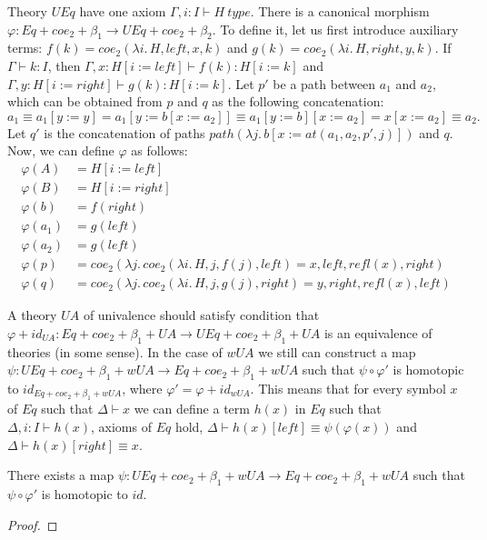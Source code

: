 \documentclass[reqno]{amsart}
\theoremstyle{definition}
\theoremstyle{remark}
\newcommand{\deq}{\equiv}
\newcommand{\repl}{:=}
\numberwithin{figure}{section}
\begin{document}
Theory $UEq$ have one axiom $\Gamma, i : I \vdash H\ type$.
There is a canonical morphism $\varphi : Eq + coe_2 + \beta_1 \to UEq + coe_2 + \beta_2$.
To define it, let us first introduce auxiliary terms: $f(k) = coe_2(\lambda i.\,H, left, x, k)$ and $g(k) = coe_2(\lambda i.\,H, right, y, k)$.
If $\Gamma \vdash k : I$, then $\Gamma, x : H[i \repl left] \vdash f(k) : H[i \repl k]$ and $\Gamma, y : H[i \repl right] \vdash g(k) : H[i \repl k]$.
Let $p'$ be a path between $a_1$ and $a_2$, which can be obtained from $p$ and $q$ as the following concatenation:
\[ a_1 \equiv a_1[y \repl y] = a_1[y \repl b[x \repl a_2]] \equiv a_1[y \repl b][x \repl a_2] = x[x \repl a_2] \equiv a_2. \]
Let $q'$ is the concatenation of paths $path(\lambda j.\,b[x \repl at(a_1, a_2, p',j)])$ and $q$.
Now, we can define $\varphi$ as follows:
\begin{align*}
\varphi(A) & = H[i \repl left] \\
\varphi(B) & = H[i \repl right] \\
\varphi(b) & = f(right) \\
\varphi(a_1) & = g(left) \\
\varphi(a_2) & = g(left) \\
\varphi(p) & = coe_2(\lambda j.\,coe_2(\lambda i.\,H, j, f(j), left) = x, left, refl(x), right) \\
\varphi(q) & = coe_2(\lambda j.\,coe_2(\lambda i.\,H, j, g(j), right) = y, right, refl(x), left)
\end{align*}

A theory $UA$ of univalence should satisfy condition that $\varphi + id_{UA} : Eq + coe_2 + \beta_1 + UA \to UEq + coe_2 + \beta_1 + UA$ is an equivalence of theories (in some sense).
In the case of $wUA$ we still can construct a map $\psi : UEq + coe_2 + \beta_1 + wUA \to Eq + coe_2 + \beta_1 + wUA$ such that $\psi \circ \varphi'$ is homotopic to $id_{Eq + coe_2 + \beta_1 + wUA}$, where $\varphi' = \varphi + id_{wUA}$.
This means that for every symbol $x$ of $Eq$ such that $\Delta \vdash x$ we can define a term $h(x)$ in $Eq$ such that
$\Delta, i : I \vdash h(x)$, axioms of $Eq$ hold, $\Delta \vdash h(x)[left] \deq \psi(\varphi(x))$ and $\Delta \vdash h(x)[right] \deq x$.

\begin{lem}[UA]
There exists a map $\psi : UEq + coe_2 + \beta_1 + wUA \to Eq + coe_2 + \beta_1 + wUA$ such that $\psi \circ \varphi'$ is homotopic to $id$.
\end{lem}
\begin{proof}
\end{proof}
\end{document}

